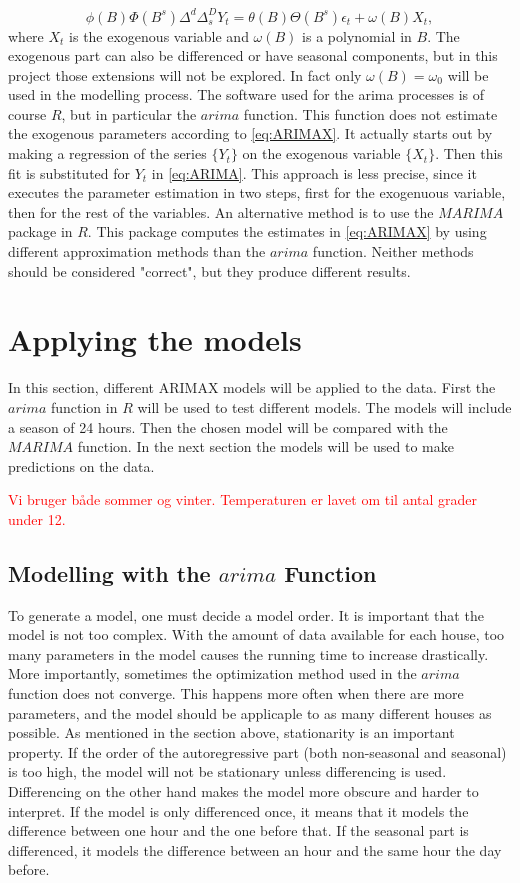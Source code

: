 \begin{equation}
    \phi (B) \Phi (B^s) \Delta^d \Delta_s^D Y_t = \theta (B) \Theta (B^s) \epsilon_t + \omega(B) X_t,
    \label{eq:ARIMAX}
\end{equation}
where $X_t$ is the exogenous variable and $\omega(B)$ is a polynomial in $B$. The exogenous part can also be differenced or have seasonal components, but in this project those extensions will not be explored. In fact only $\omega(B)=\omega_0$ will be used in the modelling process. The software used for the arima processes is of course $R$, but in particular the $arima$ function. This function does not estimate the exogenous parameters according to \cref{eq:ARIMAX}. It actually starts out by making a regression of the series $\{Y_t\}$ on the exogenous variable $\{X_t\}$. Then this fit is substituted for $Y_t$ in \cref{eq:ARIMA}. This approach is less precise, since it executes the parameter estimation in two steps, first for the exogenuous variable, then for the rest of the variables. An alternative method is to use the $MARIMA$ package in $R$. This package computes the estimates in \cref{eq:ARIMAX} by using different approximation methods than the $arima$ function. Neither methods should be considered "correct", but they produce different results.

\section{Applying the models}
In this section, different ARIMAX models will be applied to the data. First the $arima$ function in $R$ will be used to test different models. The models will include a season of 24 hours. Then the chosen model will be compared with the $MARIMA$ function. In the next section the models will be used to make predictions on the data.

\textcolor{red}{Vi bruger både sommer og vinter. Temperaturen er lavet om til antal grader under 12.}

\subsection{Modelling with the $arima$ Function}
To generate a model, one must decide a model order. It is important that the model is not too complex. With the amount of data available for each house, too many parameters in the model causes the running time to increase drastically. More importantly, sometimes the optimization method used in the $arima$ function does not converge. This happens more often when there are more parameters, and the model should be applicaple to as many different houses as possible. As mentioned in the section above, stationarity is an important property. If the order of the autoregressive part (both non-seasonal and seasonal) is too high, the model will not be stationary unless differencing is used. Differencing on the other hand makes the model more obscure and harder to interpret. If the model is only differenced once, it means that it models the difference between one hour and the one before that. If the seasonal part is differenced, it models the difference between an hour and the same hour the day before.

